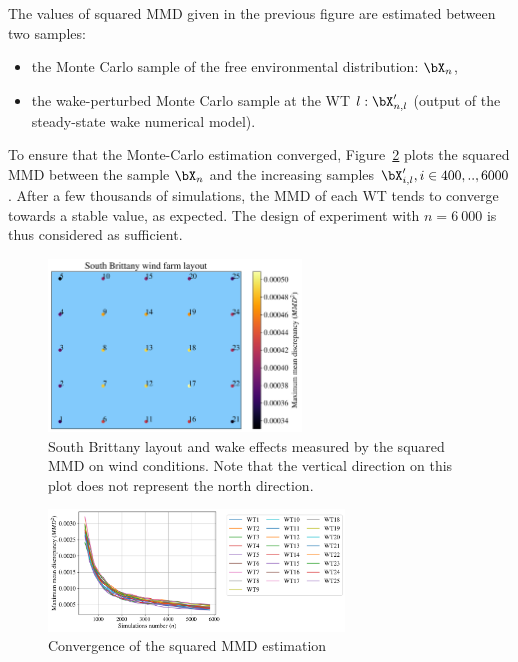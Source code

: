 The values of squared MMD given in the previous figure are estimated between two samples:
\begin{itemize}
    \item the Monte Carlo sample of the free environmental distribution: $\bX_n$,
    \item the wake-perturbed Monte Carlo sample at the WT $l: \bX'_{n,l}$ (output of the steady-state wake numerical model).
\end{itemize}

To ensure that the Monte-Carlo estimation converged, Figure~\ref{FIGConvergenceMMD} plots the squared MMD between the sample $\bX_n$ and the increasing samples $\bX'_{i,l},i \in {400,..,6000}$. 
After a few thousands of simulations, the MMD of each WT tends to converge towards a stable value, as expected. 
The design of experiment with $n=6~000$ is thus considered as sufficient. 

\begin{figure}
    \centering
    \includegraphics[width=0.6\textwidth]{part2/figures/WAKE/wake_perturbation_SB.png}
    \caption{South Brittany layout and wake effects measured by the squared MMD on wind conditions. 
    Note that the vertical direction on this plot does not represent the north direction.}
\label{FIGWakeEffect}
\end{figure}

\begin{figure}
    \centering
    \includegraphics[width=0.7\textwidth]{part2/figures/WAKE/convergence_MC_SB.png}
    \caption{Convergence of the squared MMD estimation}
\label{FIGConvergenceMMD}
\end{figure}

